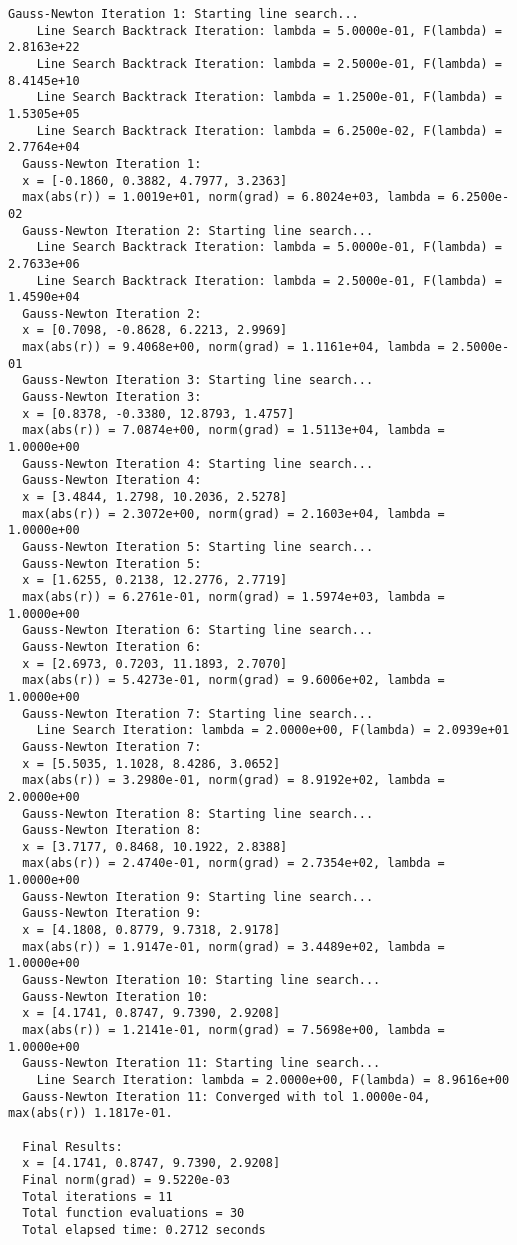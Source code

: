 \documentclass[12pt, a4paper]{article}
\begin{document}
\scriptsize\begin{Verbatim}[frame=single]
  Gauss-Newton Iteration 1: Starting line search...
    Line Search Backtrack Iteration: lambda = 5.0000e-01, F(lambda) = 2.8163e+22
    Line Search Backtrack Iteration: lambda = 2.5000e-01, F(lambda) = 8.4145e+10
    Line Search Backtrack Iteration: lambda = 1.2500e-01, F(lambda) = 1.5305e+05
    Line Search Backtrack Iteration: lambda = 6.2500e-02, F(lambda) = 2.7764e+04
  Gauss-Newton Iteration 1:
  x = [-0.1860, 0.3882, 4.7977, 3.2363]
  max(abs(r)) = 1.0019e+01, norm(grad) = 6.8024e+03, lambda = 6.2500e-02
  Gauss-Newton Iteration 2: Starting line search...
    Line Search Backtrack Iteration: lambda = 5.0000e-01, F(lambda) = 2.7633e+06
    Line Search Backtrack Iteration: lambda = 2.5000e-01, F(lambda) = 1.4590e+04
  Gauss-Newton Iteration 2:
  x = [0.7098, -0.8628, 6.2213, 2.9969]
  max(abs(r)) = 9.4068e+00, norm(grad) = 1.1161e+04, lambda = 2.5000e-01
  Gauss-Newton Iteration 3: Starting line search...
  Gauss-Newton Iteration 3:
  x = [0.8378, -0.3380, 12.8793, 1.4757]
  max(abs(r)) = 7.0874e+00, norm(grad) = 1.5113e+04, lambda = 1.0000e+00
  Gauss-Newton Iteration 4: Starting line search...
  Gauss-Newton Iteration 4:
  x = [3.4844, 1.2798, 10.2036, 2.5278]
  max(abs(r)) = 2.3072e+00, norm(grad) = 2.1603e+04, lambda = 1.0000e+00
  Gauss-Newton Iteration 5: Starting line search...
  Gauss-Newton Iteration 5:
  x = [1.6255, 0.2138, 12.2776, 2.7719]
  max(abs(r)) = 6.2761e-01, norm(grad) = 1.5974e+03, lambda = 1.0000e+00
  Gauss-Newton Iteration 6: Starting line search...
  Gauss-Newton Iteration 6:
  x = [2.6973, 0.7203, 11.1893, 2.7070]
  max(abs(r)) = 5.4273e-01, norm(grad) = 9.6006e+02, lambda = 1.0000e+00
  Gauss-Newton Iteration 7: Starting line search...
    Line Search Iteration: lambda = 2.0000e+00, F(lambda) = 2.0939e+01
  Gauss-Newton Iteration 7:
  x = [5.5035, 1.1028, 8.4286, 3.0652]
  max(abs(r)) = 3.2980e-01, norm(grad) = 8.9192e+02, lambda = 2.0000e+00
  Gauss-Newton Iteration 8: Starting line search...
  Gauss-Newton Iteration 8:
  x = [3.7177, 0.8468, 10.1922, 2.8388]
  max(abs(r)) = 2.4740e-01, norm(grad) = 2.7354e+02, lambda = 1.0000e+00
  Gauss-Newton Iteration 9: Starting line search...
  Gauss-Newton Iteration 9:
  x = [4.1808, 0.8779, 9.7318, 2.9178]
  max(abs(r)) = 1.9147e-01, norm(grad) = 3.4489e+02, lambda = 1.0000e+00
  Gauss-Newton Iteration 10: Starting line search...
  Gauss-Newton Iteration 10:
  x = [4.1741, 0.8747, 9.7390, 2.9208]
  max(abs(r)) = 1.2141e-01, norm(grad) = 7.5698e+00, lambda = 1.0000e+00
  Gauss-Newton Iteration 11: Starting line search...
    Line Search Iteration: lambda = 2.0000e+00, F(lambda) = 8.9616e+00
  Gauss-Newton Iteration 11: Converged with tol 1.0000e-04, max(abs(r)) 1.1817e-01.
  
  Final Results:
  x = [4.1741, 0.8747, 9.7390, 2.9208]
  Final norm(grad) = 9.5220e-03
  Total iterations = 11
  Total function evaluations = 30
  Total elapsed time: 0.2712 seconds
\end{Verbatim}
\end{document}
